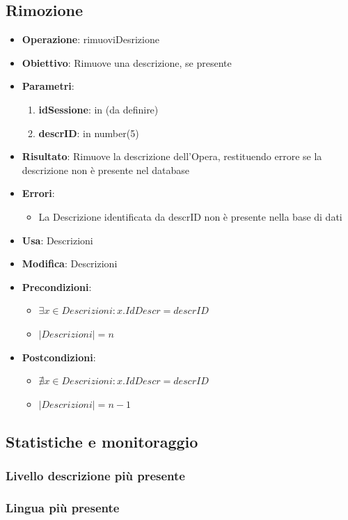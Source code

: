 \documentclass[a4paper,11pt]{article}
\begin{document}
\subsection{Rimozione}
\begin{itemize}
	\item \textbf{Operazione}: rimuoviDesrizione
	\item \textbf{Obiettivo}: Rimuove una descrizione, se presente
	\item \textbf{Parametri}:
	\begin{enumerate}
		\item \textbf{idSessione}: in (da definire)
		\item \textbf{descrID}: in number(5)
	\end{enumerate}
	\item \textbf{Risultato}: Rimuove la descrizione dell'Opera, restituendo errore se la descrizione non è presente nel database
	\item \textbf{Errori}: 
	\begin{itemize}
		\item La Descrizione identificata da descrID non è presente nella base di dati
	\end{itemize}
	\item \textbf{Usa}: Descrizioni
	\item \textbf{Modifica}: Descrizioni
	\item \textbf{Precondizioni}:
	\begin{itemize}
		\item $\exists x \in Descrizioni : x.IdDescr = descrID$
		\item $|Descrizioni| = n$
	\end{itemize}
	\item \textbf{Postcondizioni}:
	\begin{itemize}
		\item $\nexists x \in Descrizioni : x.IdDescr = descrID$
		\item $|Descrizioni| = n - 1$
	\end{itemize}
\end{itemize}

\subsection{Statistiche e monitoraggio}
\subsubsection{Livello descrizione più presente}
\subsubsection{Lingua più presente}
\end{document}
